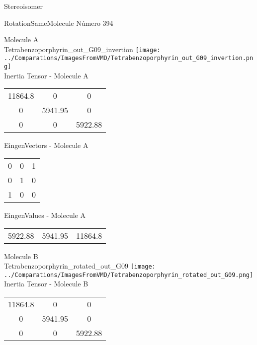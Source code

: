 \begin{center}
\vtab
\vtab
\textcolor{NavyBlue}{\Large Stereoisomer}
\end{center}

 \newpage

\vtab[-2cm]
\begin{center}
{\large RotationSameMolecule \tab Número 394}
\end{center}
\begin{multicols}{2}
\begin{center}

Molecule A \\ 
Tetrabenzoporphyrin\_out\_G09\_invertion
\texttt{[image: ../Comparations/ImagesFromVMD/Tetrabenzoporphyrin\_out\_G09\_invertion.png]}
\\
Inertia Tensor - Molecule A \\
\vtab

\begin{tabular}{|c c c|}
11864.8	 & 	0	 & 	0	 \\
0	 & 	5941.95	 & 	0	 \\
0	 & 	0	 & 	5922.88
\end{tabular}

\vtab
 EingenVectors - Molecule A     \\
\vtab
\begin{tabular}{|c c c|}
0	 & 	0	 & 	1	 \\
0	 & 	1	 & 	0	 \\
1	 & 	0	 & 	0
\end{tabular}

\vtab
 EingenValues - Molecule A     \\
\vtab
\begin{tabular}{|c c c|}
5922.88	 & 	5941.95	 & 	11864.8	 \\
\end{tabular}
\columnbreak

Molecule B \\ 
Tetrabenzoporphyrin\_rotated\_out\_G09
\texttt{[image: ../Comparations/ImagesFromVMD/Tetrabenzoporphyrin\_rotated\_out\_G09.png]}
\\
Inertia Tensor - Molecule B \\
\vtab

\begin{tabular}{|c c c|}
11864.8	 & 	0	 & 	0	 \\
0	 & 	5941.95	 & 	0	 \\
0	 & 	0	 & 	5922.88
\end{tabular}


\end{center}
\end{multicols}
